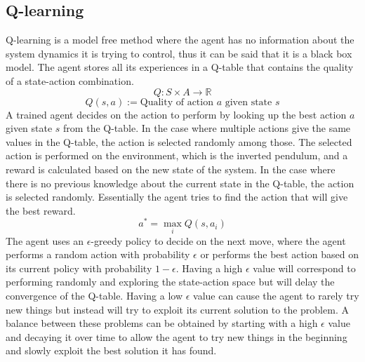 \documentclass[final]{LTHtwocol} %
\begin{document}
\subsection{Q-learning}
Q-learning is a model free method \cite{original_q_learning} where the agent has no information about the system dynamics it is trying to control, thus it can be said that it is a black box model.
The agent stores all its experiences in a Q-table that contains the quality of a state-action combination.
\begin{equation}
Q : S \times A  \to \mathbb{R}
\end{equation}
\[Q(s,a) := \text{Quality of action $a$ given state  $s$} \]
A trained agent decides on the action to perform by looking up the best action $a$ given state $s$ from the Q-table.
In the case where multiple actions give the same values in the Q-table, the action is selected randomly among those.
The selected action is performed on the environment, which is the inverted pendulum, and a reward is calculated based on the new state of the system.
In the case where there is no previous knowledge about the current state in the Q-table, the action is selected randomly.
Essentially the agent tries to find the action that will give the best reward.
\begin{equation}
 a^* = \max_i Q(s,a_i)
\end{equation}
The agent uses an $\epsilon$-greedy policy to decide on the next move, where the agent performs a random action with probability $\epsilon$ or performs the best action based on its current policy with probability $1-\epsilon$.
Having a high $\epsilon$ value will correspond to performing randomly and exploring the state-action space but will delay the convergence of the Q-table. 
Having a low $\epsilon$ value can cause the agent to rarely try new things but instead will try to exploit its current solution to the problem.
A balance between these problems can be obtained by starting with a high $\epsilon$ value and decaying it over time to allow the agent to try new things in the beginning and slowly exploit the best solution it has found. 
\end{document}
